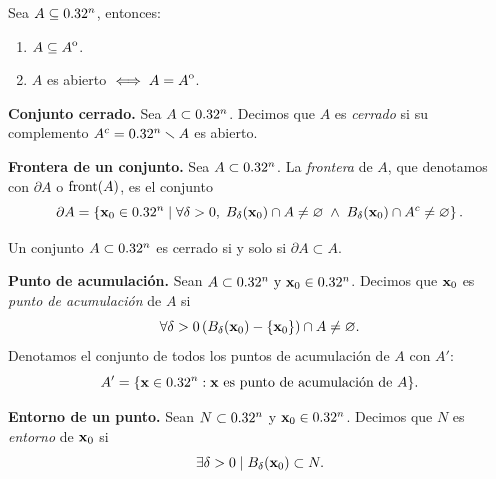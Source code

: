    \begin{propertie}  \label{prop:abierto_int}    Sea  $A \subseteq 0.32^n$, entonces:
   \begin{enumerate}
    \item \(A\subseteq {\kern0ptA}^{\mathrm{o}}\).
    \item \(A\) es abierto \(\iff A={\kern0ptA}^{\mathrm{o}}\).
    \end{enumerate}
    \end{propertie}
   
   \begin{definition} \textbf{Conjunto cerrado.} \label{def:cerrado}
    Sea $A \subset 0.32^n$. Decimos que $A$ es \emph{cerrado} si su complemento $A^c = 0.32^n \smallsetminus A$ es abierto.
   \end{definition}
   
   \begin{definition} \textbf{Frontera de un conjunto.} \label{def:frontera}
    Sea $A \subset 0.32^n$. La \emph{frontera} de $A$, que denotamos con $\partial A$ o $\operatorname{front}(A)$, es el conjunto
    \[
     \partial A = \left\lbrace \vect{x}_0 \in \Rn{n} \;|\; \forall \delta > 0, \;
     B_{\delta}(\vect{x}_0) \cap A \ne \varnothing\;\land\;
     B_{\delta}(\vect{x}_0) \cap A^c \ne \varnothing \right\rbrace.
    \]
   \end{definition}
   
   \begin{propertie} \label{prop:cerrado_front}
    Un conjunto $A \subset 0.32^n$ es cerrado si y solo si $\partial A \subset A$.
   \end{propertie}
   
   \begin{definition} \textbf{Punto de acumulaci\'on.} \label{def:pto_acum}
    Sean $A \subset \Rn{n} \text{ y } \vect{x}_0 \in \Rn{n}$. Decimos que $\vect{x}_0$ es \emph{punto de acumulaci\'on} de $A$ si
    \[
     \forall \delta > 0 \left( B_{\delta}(\vect{x}_0) - \{ \vect{x}_0 \} \right) \cap A \ne \varnothing. 
    \]
    Denotamos el conjunto de todos los puntos de acumulaci\'on de $A$ con $A'$:
    \[
     A' = \{\vect{x}\in \Rn{n} :\vect{x}\text{ es punto de acumulaci\'on de } A \}.
    \]
   
   \end{definition}
   
   \begin{definition} \textbf{Entorno de un punto.} \label{def:entorno}
    Sean $N \subset  0.32^n$ y $\vect{x}_0 \in \Rn{n}$. Decimos que $N$ es \emph{entorno} de $\vect{x}_0$ si
    \[
     \exists \delta > 0 \;|\; B_{\delta}(\vect{x}_0) \subset N.
    \]
   \end{definition}
   

